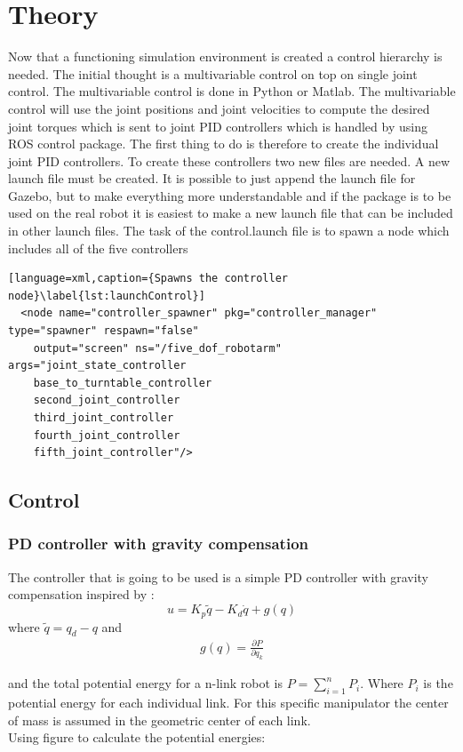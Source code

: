 \chapter{Theory}

Now that a functioning simulation environment is created a control hierarchy is needed. The initial thought is a multivariable control on top on single joint control. The multivariable control is done in Python or Matlab. The multivariable control will use the joint positions and joint velocities to compute the desired joint torques which is sent to joint PID controllers which is handled by using ROS control package. The first thing to do is therefore to create the individual joint PID controllers. 
To create these controllers two new files are needed. A new launch file must be created. It is possible to just append the launch file for Gazebo, but to make everything more understandable and if the package is to be used on the real robot it is easiest to make a new launch file that can be included in other launch files. The task of the control.launch file is to spawn a node which includes all of the five controllers
\begin{lstlisting}[language=xml,caption={Spawns the controller node}\label{lst:launchControl}]
  <node name="controller_spawner" pkg="controller_manager" type="spawner" respawn="false"
	output="screen" ns="/five_dof_robotarm" args="joint_state_controller
    base_to_turntable_controller
    second_joint_controller
    third_joint_controller
    fourth_joint_controller
    fifth_joint_controller"/>
\end{lstlisting}



\section{Control}
\subsection{PD controller with gravity compensation}
    The controller that is going to be used is a simple PD controller with gravity compensation inspired by \cite{spong}:
    $$
        u=K_p\tilde{q} - K_d\dot{q} +g(q)
    $$
     where $\tilde{q} = q_d - q$ and 
     \begin{align}\label{eq:gravity}
     g(q) = \frac{\partial P}{\partial q_k}
     \end{align}

     
     and the total potential energy for a n-link robot is $P = \sum^n_{i=1}P_i$. Where $P_i$ is the potential energy for each individual link. For this specific manipulator the center of mass is assumed in the geometric center of each link. 
     \\
     Using figure  to calculate the potential energies:

